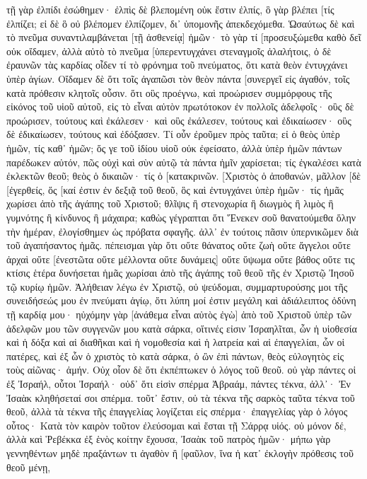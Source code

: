 τῇ γὰρ ἐλπίδι ἐσώθημεν· ἐλπὶς δὲ βλεπομένη οὐκ ἔστιν ἐλπίς, ὃ γὰρ βλέπει [τίς ἐλπίζει; 
εἰ δὲ ὃ οὐ βλέπομεν ἐλπίζομεν, δι᾽ ὑπομονῆς ἀπεκδεχόμεθα. 
Ὡσαύτως δὲ καὶ τὸ πνεῦμα συναντιλαμβάνεται [τῇ ἀσθενείᾳ] ἡμῶν· τὸ γὰρ τί [προσευξώμεθα καθὸ δεῖ οὐκ οἴδαμεν, ἀλλὰ αὐτὸ τὸ πνεῦμα [ὑπερεντυγχάνει στεναγμοῖς ἀλαλήτοις, 
ὁ δὲ ἐραυνῶν τὰς καρδίας οἶδεν τί τὸ φρόνημα τοῦ πνεύματος, ὅτι κατὰ θεὸν ἐντυγχάνει ὑπὲρ ἁγίων. 
Οἴδαμεν δὲ ὅτι τοῖς ἀγαπῶσι τὸν θεὸν πάντα [συνεργεῖ εἰς ἀγαθόν, τοῖς κατὰ πρόθεσιν κλητοῖς οὖσιν. 
ὅτι οὓς προέγνω, καὶ προώρισεν συμμόρφους τῆς εἰκόνος τοῦ υἱοῦ αὐτοῦ, εἰς τὸ εἶναι αὐτὸν πρωτότοκον ἐν πολλοῖς ἀδελφοῖς· 
οὓς δὲ προώρισεν, τούτους καὶ ἐκάλεσεν· καὶ οὓς ἐκάλεσεν, τούτους καὶ ἐδικαίωσεν· οὓς δὲ ἐδικαίωσεν, τούτους καὶ ἐδόξασεν. 
Τί οὖν ἐροῦμεν πρὸς ταῦτα; εἰ ὁ θεὸς ὑπὲρ ἡμῶν, τίς καθ᾽ ἡμῶν; 
ὅς γε τοῦ ἰδίου υἱοῦ οὐκ ἐφείσατο, ἀλλὰ ὑπὲρ ἡμῶν πάντων παρέδωκεν αὐτόν, πῶς οὐχὶ καὶ σὺν αὐτῷ τὰ πάντα ἡμῖν χαρίσεται; 
τίς ἐγκαλέσει κατὰ ἐκλεκτῶν θεοῦ; θεὸς ὁ δικαιῶν· 
τίς ὁ [κατακρινῶν. [Χριστὸς ὁ ἀποθανών, μᾶλλον [δὲ [ἐγερθείς, ὅς [καί ἐστιν ἐν δεξιᾷ τοῦ θεοῦ, ὃς καὶ ἐντυγχάνει ὑπὲρ ἡμῶν· 
τίς ἡμᾶς χωρίσει ἀπὸ τῆς ἀγάπης τοῦ Χριστοῦ; θλῖψις ἢ στενοχωρία ἢ διωγμὸς ἢ λιμὸς ἢ γυμνότης ἢ κίνδυνος ἢ μάχαιρα; 
καθὼς γέγραπται ὅτι Ἕνεκεν σοῦ θανατούμεθα ὅλην τὴν ἡμέραν, ἐλογίσθημεν ὡς πρόβατα σφαγῆς. 
ἀλλ᾽ ἐν τούτοις πᾶσιν ὑπερνικῶμεν διὰ τοῦ ἀγαπήσαντος ἡμᾶς. 
πέπεισμαι γὰρ ὅτι οὔτε θάνατος οὔτε ζωὴ οὔτε ἄγγελοι οὔτε ἀρχαὶ οὔτε [ἐνεστῶτα οὔτε μέλλοντα οὔτε δυνάμεις] 
οὔτε ὕψωμα οὔτε βάθος οὔτε τις κτίσις ἑτέρα δυνήσεται ἡμᾶς χωρίσαι ἀπὸ τῆς ἀγάπης τοῦ θεοῦ τῆς ἐν Χριστῷ Ἰησοῦ τῷ κυρίῳ ἡμῶν. 
Ἀλήθειαν λέγω ἐν Χριστῷ, οὐ ψεύδομαι, συμμαρτυρούσης μοι τῆς συνειδήσεώς μου ἐν πνεύματι ἁγίῳ, 
ὅτι λύπη μοί ἐστιν μεγάλη καὶ ἀδιάλειπτος ὀδύνη τῇ καρδίᾳ μου· 
ηὐχόμην γὰρ [ἀνάθεμα εἶναι αὐτὸς ἐγὼ] ἀπὸ τοῦ Χριστοῦ ὑπὲρ τῶν ἀδελφῶν μου τῶν συγγενῶν μου κατὰ σάρκα, 
οἵτινές εἰσιν Ἰσραηλῖται, ὧν ἡ υἱοθεσία καὶ ἡ δόξα καὶ αἱ διαθῆκαι καὶ ἡ νομοθεσία καὶ ἡ λατρεία καὶ αἱ ἐπαγγελίαι, 
ὧν οἱ πατέρες, καὶ ἐξ ὧν ὁ χριστὸς τὸ κατὰ σάρκα, ὁ ὢν ἐπὶ πάντων, θεὸς εὐλογητὸς εἰς τοὺς αἰῶνας· ἀμήν. 
Οὐχ οἷον δὲ ὅτι ἐκπέπτωκεν ὁ λόγος τοῦ θεοῦ. οὐ γὰρ πάντες οἱ ἐξ Ἰσραήλ, οὗτοι Ἰσραήλ· 
οὐδ᾽ ὅτι εἰσὶν σπέρμα Ἀβραάμ, πάντες τέκνα, ἀλλ᾽· Ἐν Ἰσαὰκ κληθήσεταί σοι σπέρμα. 
τοῦτ᾽ ἔστιν, οὐ τὰ τέκνα τῆς σαρκὸς ταῦτα τέκνα τοῦ θεοῦ, ἀλλὰ τὰ τέκνα τῆς ἐπαγγελίας λογίζεται εἰς σπέρμα· 
ἐπαγγελίας γὰρ ὁ λόγος οὗτος· Κατὰ τὸν καιρὸν τοῦτον ἐλεύσομαι καὶ ἔσται τῇ Σάρρᾳ υἱός. 
οὐ μόνον δέ, ἀλλὰ καὶ Ῥεβέκκα ἐξ ἑνὸς κοίτην ἔχουσα, Ἰσαὰκ τοῦ πατρὸς ἡμῶν· 
μήπω γὰρ γεννηθέντων μηδὲ πραξάντων τι ἀγαθὸν ἢ [φαῦλον, ἵνα ἡ κατ᾽ ἐκλογὴν πρόθεσις τοῦ θεοῦ μένῃ, 
